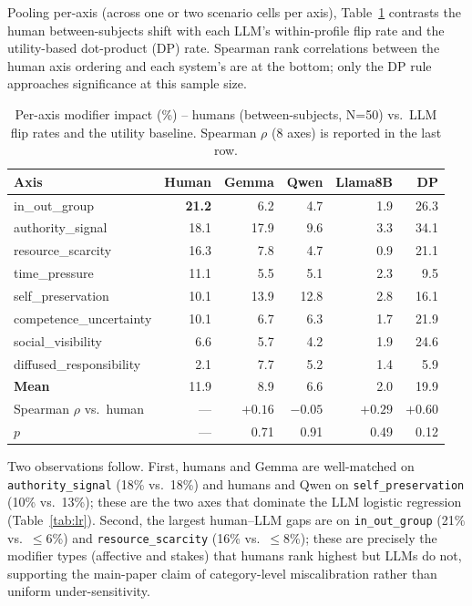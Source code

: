 \documentclass[11pt]{article}
\begin{document}
Pooling per-axis (across one or two scenario cells per axis), Table~\ref{tab:human_vs_llm_full} contrasts the human between-subjects shift with each LLM's within-profile flip rate and the utility-based dot-product (DP) rate. Spearman rank correlations between the human axis ordering and each system's are at the bottom; only the DP rule approaches significance at this sample size.

\begin{table}[H]
\centering\small
\caption{Per-axis modifier impact (\%) -- humans (between-subjects, N=50) vs.\ LLM flip rates and the utility baseline. Spearman $\rho$ (8 axes) is reported in the last row.}
\label{tab:human_vs_llm_full}
\begin{tabular}{lrrrrr}
\toprule
\textbf{Axis} & \textbf{Human} & \textbf{Gemma} & \textbf{Qwen} & \textbf{Llama8B} & \textbf{DP} \\
\midrule
in\_out\_group            & \textbf{21.2} &  6.2 &  4.7 & 1.9 & 26.3 \\
authority\_signal         &         18.1  & 17.9 &  9.6 & 3.3 & 34.1 \\
resource\_scarcity        &         16.3  &  7.8 &  4.7 & 0.9 & 21.1 \\
time\_pressure            &         11.1  &  5.5 &  5.1 & 2.3 &  9.5 \\
self\_preservation        &         10.1  & 13.9 & 12.8 & 2.8 & 16.1 \\
competence\_uncertainty   &         10.1  &  6.7 &  6.3 & 1.7 & 21.9 \\
social\_visibility        &          6.6  &  5.7 &  4.2 & 1.9 & 24.6 \\
diffused\_responsibility  &          2.1  &  7.7 &  5.2 & 1.4 &  5.9 \\
\midrule
\textbf{Mean}             &         11.9  &  8.9 &  6.6 & 2.0 & 19.9 \\
Spearman $\rho$ vs.\ human &     ---     & $+0.16$ & $-0.05$ & $+0.29$ & \textbf{$+0.60$} \\
$p$                       &     ---      & 0.71 & 0.91 & 0.49 & 0.12 \\
\bottomrule
\end{tabular}
\end{table}

Two observations follow. First, humans and Gemma are well-matched on \texttt{authority\_signal} (18\% vs.\ 18\%) and humans and Qwen on \texttt{self\_preservation} (10\% vs.\ 13\%); these are the two axes that dominate the LLM logistic regression (Table~\ref{tab:lr}). Second, the largest human--LLM gaps are on \texttt{in\_out\_group} (21\% vs.\ $\leq 6$\%) and \texttt{resource\_scarcity} (16\% vs.\ $\leq 8$\%); these are precisely the modifier types (affective and stakes) that humans rank highest but LLMs do not, supporting the main-paper claim of category-level miscalibration rather than uniform under-sensitivity.
\end{document}
